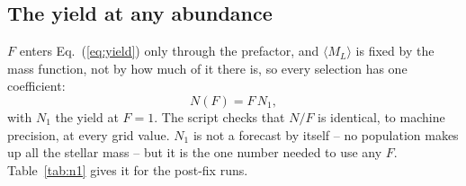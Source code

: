 \documentclass[english,10pt,a4paper]{article}
\begin{document}
	\subsection{The yield at any abundance}

	$F$ enters Eq.~(\ref{eq:yield}) only through the prefactor, and $\langle M_L\rangle$ is fixed by the mass function, not by how much of it there is, so every selection has one coefficient:
	\begin{equation}
		N(F) = F\,N_1 ,
		\label{eq:linear}
	\end{equation}
	with $N_1$ the yield at $F=1$. The script checks that $N/F$ is identical, to machine precision, at every grid value. $N_1$ is not a forecast by itself -- no population makes up all the stellar mass -- but it is the one number needed to use any $F$. Table~\ref{tab:n1} gives it for the post-fix runs.
\end{document}
